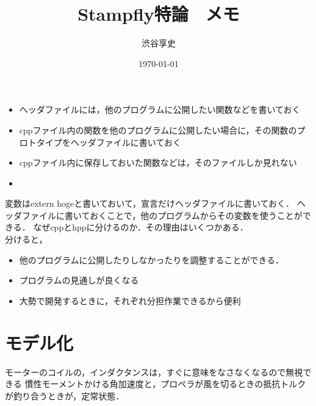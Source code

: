 \documentclass[a4paper,11pt]{jsarticle}
\begin{document}
\title{Stampfly特論　メモ}
\author{渋谷享史}
\date{\today}
\maketitle

\begin{itemize}
  \item へッダファイルには，他のプログラムに公開したい関数などを書いておく
  \item cppファイル内の関数を他のプログラムに公開したい場合に，その関数のプロトタイプをヘッダファイルに書いておく
  \item cppファイル内に保存しておいた関数などは，そのファイルしか見れない
  \item 
\end{itemize}


変数はextern hogeと書いておいて，宣言だけヘッダファイルに書いておく．
ヘッダファイルに書いておくことで，他のプログラムからその変数を使うことができる．
なぜcppとhppに分けるのか．その理由はいくつかある．
\\分けると，
\begin{itemize}
  \item 他のプログラムに公開したりしなかったりを調整することができる．
  \item プログラムの見通しが良くなる
  \item 大勢で開発するときに，それぞれ分担作業できるから便利
\end{itemize}

\section{モデル化}
モーターのコイルの，インダクタンスは，すぐに意味をなさなくなるので無視できる
慣性モーメントかける角加速度と，プロペラが風を切るときの抵抗トルクが釣り合うときが，定常状態．
\end{document}
